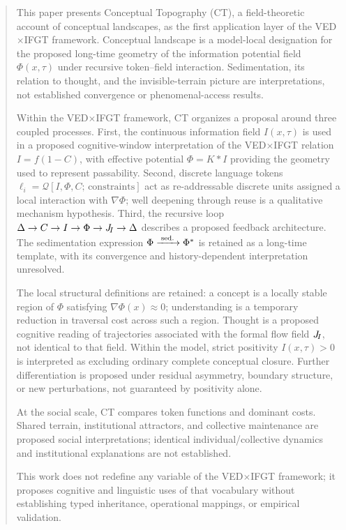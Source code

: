 
\begin{abstract}
This paper presents Conceptual Topography (CT), a field-theoretic
account of conceptual landscapes, as the first application layer of
the VED$\times$IFGT framework.
Conceptual landscape is a model-local designation for the proposed
long-time geometry of the information potential field $\Phi(x,\tau)$
under recursive token--field interaction. Sedimentation, its relation to
thought, and the invisible-terrain picture are interpretations, not
established convergence or phenomenal-access results.

Within the VED$\times$IFGT framework, CT organizes a proposal around
three coupled processes.
First, the continuous information field $I(x,\tau)$ is used in a proposed
cognitive-window interpretation of the VED$\times$IFGT relation
$I=f(1-C)$, with effective potential $\Phi = K * I$ providing the
geometry used to represent passability.
Second, discrete language tokens
$\ell_i = \mathcal{Q}[I,\Phi,C;\,\text{constraints}]$ act as
re-addressable discrete units assigned a local interaction with $\nabla\Phi$;
well deepening through reuse is a qualitative mechanism hypothesis.
Third, the recursive loop
$\Delta \to C \to I \to \Phi \to \JI \to \Delta$
describes a proposed feedback architecture. The sedimentation expression
$\Phi \seddto \Phistar$ is retained as a long-time template, with its
convergence and history-dependent interpretation unresolved.

The local structural definitions are retained: a concept is a locally
stable region of $\Phi$ satisfying $\nabla\Phi(x) \approx 0$; understanding
is a temporary reduction in traversal cost across such a region.
Thought is a proposed cognitive reading of trajectories associated with
the formal flow field $\JI$, not identical to that field.
Within the model, strict positivity $I(x,\tau) > 0$ is interpreted as
excluding ordinary complete conceptual closure. Further differentiation
is proposed under residual asymmetry, boundary structure, or new
perturbations, not guaranteed by positivity alone.

At the social scale, CT compares token functions and dominant costs.
Shared terrain, institutional attractors, and collective maintenance are
proposed social interpretations; identical individual/collective dynamics
and institutional explanations are not established.

This work does not redefine any variable of the VED$\times$IFGT framework;
it proposes cognitive and linguistic uses of that vocabulary without
establishing typed inheritance, operational mappings, or empirical validation.
\end{abstract}
